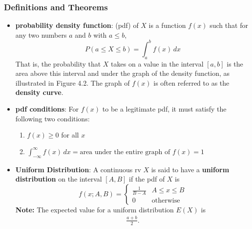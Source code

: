 \documentclass{report}
\begin{document}
    \subsubsection{Definitions and Theorems}
    \begin{itemize}
        \item \textbf{probability density function}: (pdf) of $X$ is a function $f(x)$ such that for any two numbers $a$ and $b$ with $a \leq b$,
            \[
                P(a \leq X \leq b) = \int_{a}^{b} f(x) \, dx
            \]
            That is, the probability that $X$ takes on a value in the interval $[a, b]$ is the area above this interval and under the graph of the density function, as illustrated in Figure 4.2. The graph of $f(x)$ is often referred to as the \textbf{density curve}. 
        \item \textbf{pdf conditions}:
            For $f(x)$ to be a legitimate pdf, it must satisfy the following two conditions:
            \begin{enumerate}
                \item $f(x) \geq 0$ for all $x$
                \item $\int_{-\infty}^{\infty} f(x) \, dx = \text{area under the entire graph of } f(x) = 1$
            \end{enumerate}
        \item \textbf{Uniform Distribution}:
            A continuous rv $X$ is said to have a \textbf{uniform distribution} on the interval $[A, B]$ if the pdf of $X$ is
            \[
                f(x; A, B) = 
                \begin{cases} 
                    \frac{1}{B - A} & A \leq x \leq B \\ 
                    0 & \text{otherwise} 
                \end{cases}
            \]
            \bigbreak \noindent 
            \textbf{Note:} The expected value for a uniform distribution $E(X)$ is 
            \begin{align*}
                \frac{a+b}{2}
            .\end{align*}


\end{itemize}
\end{document}
